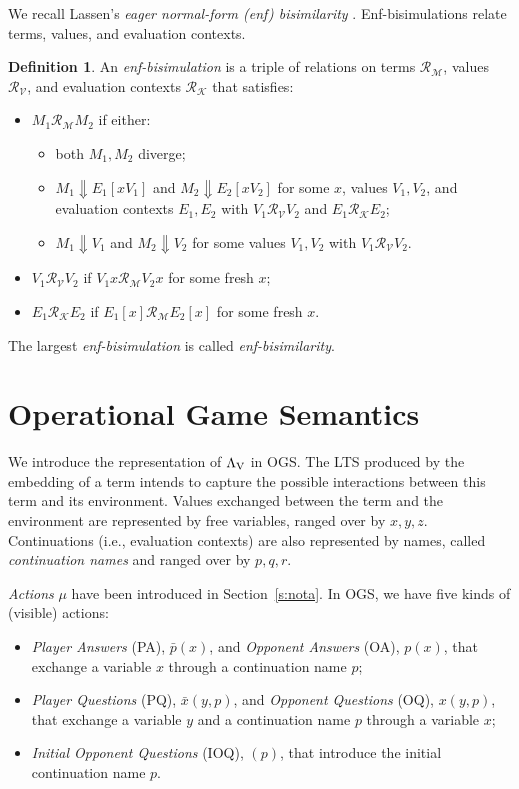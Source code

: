 \documentclass[11pt,a4paper]{amsart}
\theoremstyle{plain}
\theoremstyle{definition}
\theoremstyle{defC}
\theoremstyle{thmC}
\theoremstyle{plain}
\numberwithin{equation}{section}
\def\RR{\mathrel{\mathcal R}}
\newcommand{\LasV}{\Lambda_{\rm V}} %
\newcommand{\enfM}{\mathcal{M}}
\newcommand{\enfK}{\mathcal{K}}
\newcommand{\enfV}{\mathcal{V}}
\newcommand{\act}{\mu}
\newcommand{\ansP}[2]{\bar{#1}(#2)}
\newcommand{\questP}[2]{\bar{#1}(#2)}
\newcommand{\ansO}[2]{#1(#2)}
\newcommand{\questO}[2]{#1(#2)}
\newcommand{\questOinit}[1]{(#1)}
\newcommand{\Converge}{\mathrel{\Downarrow}}
\theoremstyle{plain}
\theoremstyle{definition}
\newtheorem{definition}[thm]{Definition}
\begin{document}
 We recall  Lassen's 
\emph{eager normal-form (enf) bisimilarity} \cite{lassentrees}.
Enf-bisimulations relate terms, values, and evaluation contexts.

\begin{definition}
\label{d:enf}
 An \emph{enf-bisimulation} is a triple of relations on terms $\RR_{\enfM}$,
 values $\RR_{\enfV}$, and evaluation contexts $\RR_{\enfK}$ that satisfies:
 
 \begin{itemize}
  \item $M_1 \RR_{\enfM} M_2$ if either:
  \begin{itemize}
   \item both $M_1,M_2$ diverge;
   \item $M_1 \Converge E_1[x V_1]$ and $M_2 \Converge E_2[x V_2]$
   for some $x$, values $V_1,V_2$, and evaluation contexts $E_1,E_2$ with
   $V_1 \RR_{\enfV} V_2$ and $E_1 \RR_{\enfK} E_2$;
   \item $M_1 \Converge V_1$ and $M_2 \Converge V_2$ for some values $V_1,V_2$
   with $V_1 \RR_{\enfV} V_2$.
  \end{itemize}
  \item $V_1 \RR_{\enfV} V_2$ if $V_1 x \RR_{\enfM} V_2 x$ for some fresh $x$;
  \item $E_1 \RR_{\enfK} E_2$ if $E_1[x] \RR_{\enfM} E_2[x]$ for some fresh $x$.
 \end{itemize}
 \noindent
 The largest \emph{enf-bisimulation} is called \emph{enf-bisimilarity}.
\end{definition} 
\section{Operational Game Semantics}
\label{s:AOGS}
 
We introduce the representation of $\LasV$ in OGS. 
The LTS produced by the embedding of a term intends to capture the possible interactions 
between this term and its environment.
Values exchanged between the term and the environment are represented by free variables, 
ranged over by $x,y,z$. 
Continuations (i.e., evaluation contexts) are also
represented by names, called \emph{continuation names} and ranged over by  $p,q,r$.

\emph{Actions} $\act$ have been introduced in Section~\ref{s:nota}. 
In OGS, we have five kinds of (visible) actions:
\begin{itemize}
  \item \emph{Player Answers} (PA), $\ansP{p}{x}$,
  and \emph{Opponent Answers} (OA),  $\ansO{p}{x}$,
  that exchange a variable $x$ through a continuation name $p$;
  \item \emph{Player Questions} (PQ), $\questP{x}{y,p}$,
  and \emph{Opponent Questions} (OQ), $\questO{x}{y,p}$, 
  that exchange a variable $y$ and a continuation name $p$ through a variable $x$;
  \item \emph{Initial Opponent Questions} (IOQ), $\questOinit{p}$, that
  introduce the initial continuation name $p$.
\end{itemize}
 
\end{document}
